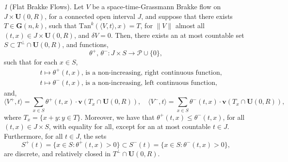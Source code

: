 \documentclass{article}
\theoremstyle{plain}
\theoremstyle{definition}
\theoremstyle{plain}
\theoremstyle{remark}
\newtheorem{propparagraph}[theorem]{}
\theoremstyle{remark}
\theoremstyle{plain}
\begin{document}
\begin{propparagraph}[Flat Brakke Flows]\label{prop: flat Brakke flows}
    Let $V$ be a space-time-Grassmann Brakke flow on $J \times \mathbf{U} (0, R)$, for a connected open interval $J$, and suppose that there exists  $T \in \mathbf{G} (n, k)$, such that $\mathrm{Tan}^{k} ( \langle V, t \rangle, x) = T$, for $\| V \|$ almost all $(t, x) \in J \times \mathbf{U} (0, R)$, 
    and $\delta V = 0$.
    Then, there exists an at most countable set $S \subset T^{\perp} \cap \mathbf{U} (0, R)$, and functions, 
    \begin{equation*}
        \theta^{+}, \, \theta^{-} \colon J \times S \rightarrow \mathscr{P} \cup \{0\}, 
    \end{equation*}
    such that for each $x \in S$, 
    \begin{eqnarray*}
        && t \mapsto \theta^{+} (t, x), \, \text{is a non-increasing, right continuous function}, \\
        && t \mapsto \theta^{-} (t, x), \, \text{is a non-increasing, left continuous function},
    \end{eqnarray*}
    and, 
    \begin{equation*}
        \langle V^{+}, t \rangle = \sum_{x \in S} \theta^{+} (t, x) \cdot \mathbf{v} (T_{x} \cap \mathbf{U} (0, R)), \quad \langle V^{-}, t \rangle = \sum_{x \in S} \theta^{-} (t, x) \cdot \mathbf{v} (T_{x} \cap \mathbf{U} (0, R)),
    \end{equation*}
    where $T_{x} = \{ x + y \colon y \in T\}$.
    Moreover, we have that $\theta^{+} (t, x) \leq \theta^{-} (t, x)$, for all $(t, x) \in J \times S$, with equality for all, except for an at most countable $t \in J$. 
    Furthermore, for all $t \in J$, the sets
    \begin{equation*}
        S^{+} (t) = \{ x \in S \colon \theta^{+} (t, x) > 0\} \subset S^{-} (t) = \{ x \in S \colon \theta^{-} (t, x) > 0\},
    \end{equation*}
    are discrete, and relatively closed in $T^{\perp} \cap \mathbf{U} (0, R)$.
\end{propparagraph}
\end{document}
